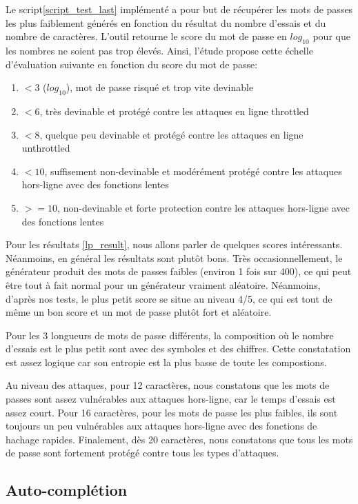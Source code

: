Le script\ref{script_test_last} implémenté a pour but de récupérer les mots de passes les plus faiblement générés en fonction du résultat du nombre d'essais et du nombre de caractères. L'outil retourne le score du mot de passe en $log_{10}$ pour que les nombres ne soient pas trop élevés. Ainsi, l'étude propose cette échelle d'évaluation suivante en fonction du score du mot de passe:

\begin{enumerate}
	\item $< 3$ ($log_{10}$), mot de passe risqué et trop vite devinable
	\item $< 6$, très devinable et protégé contre les attaques en ligne throttled
	\item $< 8$, quelque peu devinable et protégé contre les attaques en ligne unthrottled
	\item $< 10$, suffisement non-devinable et modérément protégé contre les attaques hors-ligne avec des fonctions lentes
	\item $>= 10$, non-devinable et forte protection contre les attaques hors-ligne avec des fonctions lentes	
\end{enumerate}

Pour les résultats \ref{lp_result}, nous allons parler de quelques scores intéressants. Néanmoins, en général les résultats sont plutôt bons. Très occasionnellement, le générateur produit des mots de passes faibles (environ 1 fois sur 400), ce qui peut être tout à fait normal pour un générateur vraiment aléatoire. Néanmoins, d'après nos tests, le plus petit score se situe au niveau 4/5, ce qui est tout de même un bon score et un mot de passe plutôt fort et aléatoire. 

Pour les 3 longueurs de mots de passe différents, la composition où le nombre d'essais est le plus petit sont avec des symboles et des chiffres. Cette constatation est assez logique car son entropie est la plus basse de toute les compostions.

Au niveau des attaques, pour 12 caractères, nous constatons que les mots de passes sont assez vulnérables aux attaques hors-ligne, car le temps d'essais est assez court. Pour 16 caractères, pour les mots de passe les plus faibles, ils sont toujours un peu vulnérables aux attaques hors-ligne avec des fonctions de hachage rapides. Finalement, dès 20 caractères, nous constatons que tous les mots de passe sont fortement protégé contre tous les types d'attaques. 

\subsection{Auto-complétion}

